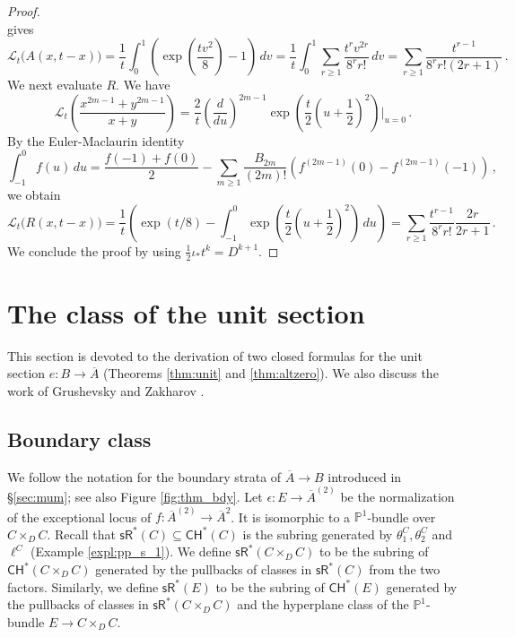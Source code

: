 \documentclass[11pt]{article}
\def\CH{\mathsf{CH}}
\def\PP{\mathbb{P}}
\def\sR{\mathsf{sR}}
\newcommand{\barA}{\overline{A}}
\theoremstyle{definition}
\begin{document}
\begin{proof}
\[    \]
    gives
    $$
    \mathcal L_t\bigl(A(x,t-x)\bigr)=
    \frac1t\int_0^1
    \left(\exp\left(\frac{tv^2}{8}\right)-1\right)\,dv=\frac1t\int_0^1
    \sum_{r\geq1}\frac{t^rv^{2r}}{8^r r!}\,dv=
    \sum_{r\geq1}
    \frac{t^{r-1}}{8^r r!(2r+1)}\,.
    $$
    We next evaluate \(R\). We have
    \[
    \mathcal L_t \left(\frac{x^{2m-1}+y^{2m-1}}{x+y}\right)
    =
    \frac{2}{t}\left(\frac{d}{du}\right)^{2m-1}\exp\left(\frac t2\left(u+\frac12\right)^2\right)\Bigg|_{u=0}\,.
    \]
    By the Euler-Maclaurin identity
    $$
    \int_{-1}^0f(u)\, du = \frac{f(-1)+f(0)}{2} - \sum_{m\geq 1}\frac{B_{2m}}{(2m)!}\left(f^{(2m-1)}(0) - f^{(2m-1)}(-1)\right)\,,
    $$
    we obtain
    $$
    \mathcal L_t\bigl(R(x,t-x)\bigr)=\frac1t\left(\exp(t/8)-\int_{-1}^0\exp\left(\frac t2\left(u+\frac12\right)^2\right)\,du\right)=\sum_{r\geq1}\frac{t^{r-1}}{8^r r!}\frac{2r}{2r+1}\,.
    $$
    We conclude the proof by using $\frac{1}{2}\iota_* t^k = D^{k+1}$.
\end{proof}

\section{The class of the unit section}\label{sec:unit}

This section is devoted to the derivation of two closed formulas for the unit section $e : B \to \barA$ (Theorems \ref{thm:unit} and \ref{thm:altzero}). We also discuss the work of Grushevsky and Zakharov \cite{GZ}.

\subsection{Boundary class}

We follow the notation for the boundary strata of $\barA \to B$ introduced in \S\ref{sec:mum}; see also Figure \ref{fig:thm_bdy}.
Let $\epsilon :E \to \barA^{(2)}$ be the normalization of the exceptional locus of $f: \barA^{(2)}\to \barA^2$. It is isomorphic to a $\PP^1$-bundle over $C \times_D C$.
Recall that $\sR^*(C)\subseteq \CH^*(C)$ is the subring generated by $\theta_1^C,\theta_2^C$ and $\ell^C$ (Example \ref{expl:pp_s_1}).
We define $\sR^{\ast}(C\times_D C)$ to be the subring of $\CH^{\ast}(C\times_D C)$ generated by the pullbacks of classes in $\sR^{\ast}(C)$
from the two factors. Similarly, we define
$\sR^{\ast}(E)$ to be the subring of $\CH^{\ast}(E)$ generated by the pullbacks of classes in $\sR^{\ast}(C\times_D C)$ and the hyperplane class of the $\mathbb{P}^{1}$-bundle $E\to C\times_D C$.
\end{document}
